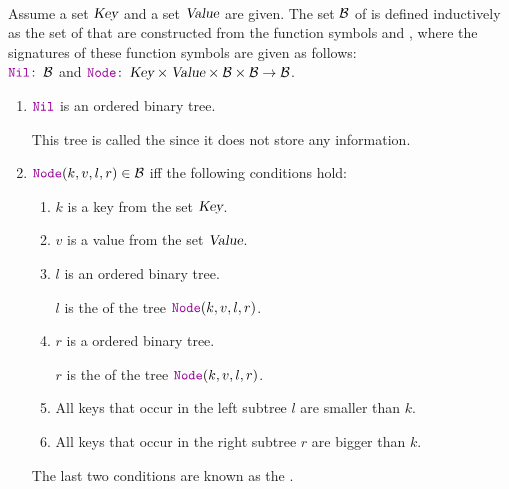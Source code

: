 \begin{Definition}  \hspace*{\fill} \\
  Assume a set $\textsl{Key}$ and a set $\textsl{Value}$ are given.
  The set $\mathcal{B}$ of   is defined
  inductively as the set of  that are constructed from the function symbols  and
  , where the signatures of these function symbols are given as follows: \\[0.2cm]
  \hspace*{1.3cm} 
  $\mytt{Nil}\!:\; \Bin$ \qquad and \qquad  $\mytt{Node}\!:\; \textsl{Key} \times \textsl{Value} \times \Bin \times \Bin \rightarrow \Bin$.
  \begin{enumerate}
  \item $\mytt{Nil}$ is an ordered binary tree. 

        This tree is called the   since it does not store any information.
  \item $\mytt{Node}(k, v, l, r) \in \Bin$ \quad iff the following conditions hold: 
        \begin{enumerate}
        \item $k$ is a key from the set $\textsl{Key}$.
        \item $v$ is a value from the set $\textsl{Value}$.
        \item $l$ is an ordered binary tree.

              $l$ is the    of the tree $\mytt{Node}(k, v, l, r)$.
        \item $r$ is a ordered binary tree.

              $r$ is the   of the tree $\mytt{Node}(k, v, l, r)$.
        \item All keys that occur in the left subtree $l$ are smaller than $k$.
        \item All keys that occur in the right subtree $r$ are bigger than $k$.
        \end{enumerate}
        The last two conditions are known as the . 
        \eox
\end{enumerate}
\end{Definition}


